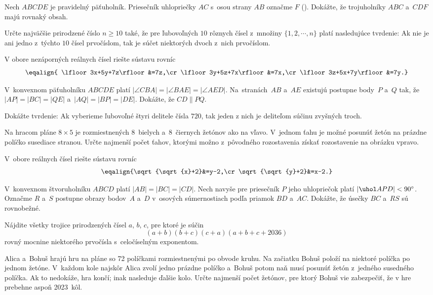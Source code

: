 {%
Nech $ABCDE$ je pravidelný päťuholník. Priesečník uhlopriečky $AC$ s~osou strany $AB$ označme $F$ (\obr). Dokážte, že trojuholníky $ABC$ a~$CDF$ majú rovnaký obsah.
%
}

{%
Určte najväčšie prirodzené číslo $n\ge 10$ také, že pre ľubovoľných $10$ rôznych čísel z~množiny $\{1,2,\cdots, n\}$ platí nasledujúce tvrdenie: Ak nie je ani jedno z~týchto $10$ čísel prvočíslom, tak je súčet niektorých dvoch z~nich prvočíslom.}

{%
V obore nezáporných reálnych čísel riešte sústavu rovníc
$$\eqalign{
\lfloor 3x+5y+7z\rfloor&=7z,\cr
\lfloor 3y+5z+7x\rfloor&=7x,\cr
\lfloor 3z+5x+7y\rfloor&=7y.}
$$}

{%
V~konvexnom päťuholníku $ABCDE$ platí $|\angle CBA| = |\angle BAE| = |\angle AED|$. Na~stranách~$AB$ a~$AE$ existujú postupne body~$P$ a~$Q$ tak, že $|AP| = |BC| = |QE|$ a~$|AQ|=|BP|=|DE|$. Dokážte, že $CD \parallel PQ$.}

{%
Dokážte tvrdenie: Ak vyberieme ľubovoľné štyri delitele čísla $720$, tak jeden z nich je deliteľom súčinu zvyšných troch.}

{%
Na hracom pláne $8\times 5$ je rozmiestnených 8~bielych a~8~čiernych žetónov
ako na \obr{} vľavo. V~jednom ťahu je
možné posunúť žetón na prázdne políčko susediace stranou. Určte najmenší počet ťahov, ktorými možno z~pôvodného rozostavenia získať rozostavenie na
obrázku vpravo.
}

{%
V~obore reálnych čísel riešte sústavu rovníc
$$\eqalign{\sqrt{\sqrt{x}+2}&=y-2,\cr
\sqrt{\sqrt{y}+2}&=x-2.}$$}

{%
V~konvexnom štvoruholníku $ABCD$ platí $|AB|=|BC|=|CD|$.
Nech navyše pre priesečník $P$ jeho uhlopriečok platí $|\uhol APD|<90^{\circ}$.
Označme $R$ a~$S$ postupne obrazy bodov~$A$ a~$D$ v~osových súmernostiach podľa priamok $BD$ a~$AC$.
Dokážte, že úsečky $BC$ a~$RS$ sú rovnobežné.
}

{%
Nájdite všetky trojice prirodzených čísel $a$, $b$, $c$, pre ktoré je súčin
$$(a+b)(b+c)(c+a)(a+b+c+2036)$$ rovný mocnine niektorého prvočísla s~celočíselným exponentom.}

{%
Alica a~Bohuš hrajú hru na pláne so 72 políčkami rozmiestnenými po obvode kruhu.
Na začiatku Bohuš položí na niektoré políčka po jednom žetóne.
V~každom kole najskôr Alica zvolí jedno prázdne políčko
a~Bohuš potom naň musí posunúť žetón z~jedného susedného políčka.
Ak to nedokáže, hra končí; inak nasleduje ďalšie kolo. Určte najmenší počet žetónov, pre ktorý Bohuš vie zabezpečiť, že v hre prebehne aspoň 2023~kôl.}

